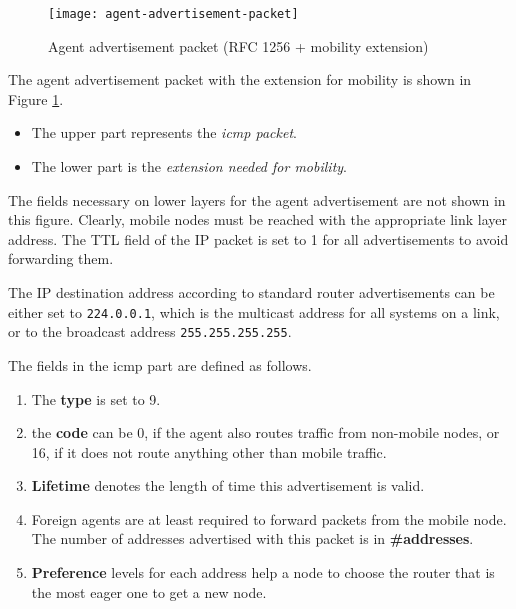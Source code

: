 	
	\begin{figure}[ht!]
	\centering
	\texttt{[image: agent-advertisement-packet]}
	\caption[Agent advertisement packet.]{Agent advertisement packet (RFC 1256 + mobility extension)}\label{fig:agent_advertisement}
	\end{figure}
	
	
The agent advertisement packet with the extension for mobility is shown in Figure \ref{fig:agent_advertisement}. 
\begin{itemize}
	\item The upper part represents the \textit{\gls{icmp} packet}.
	\item The lower part is the \textit{extension needed for mobility}.
\end{itemize}
 The fields necessary on lower layers for the agent advertisement are not shown in this figure. Clearly, mobile nodes must be reached with the appropriate link layer address. The TTL field of the IP packet is set to 1 for all advertisements to avoid forwarding them.

The IP destination address according to standard router advertisements can be either set to \verb|224.0.0.1|, which is the multicast address for all systems on a link, or to the broadcast address \verb|255.255.255.255|.

The fields in the \gls{icmp} part are defined as follows. 

\begin{multicols}{2}
\begin{enumerate}
	\item The \textbf{type} is set to 9.
	
	\item the \textbf{code} can be 0, if the agent also routes traffic from non-mobile nodes, or 16, if it does not route anything other than mobile traffic.
	
	\item \textbf{Lifetime} denotes the length of time this advertisement is valid.
	
	\item Foreign agents are at least required to forward packets from the mobile node. The number of addresses advertised with this packet is in \textbf{\#addresses}.
	
	\item \textbf{Preference} levels for each address help a node to choose the router that is the most eager one to get a new node.
\end{enumerate}
\end{multicols}



